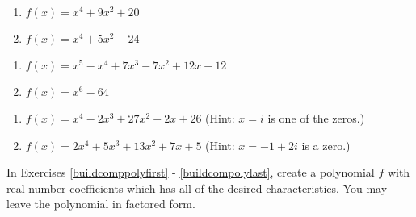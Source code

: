 \begin{multicols}{2}
\begin{enumerate}
\setcounter{enumi}{\value{HW}}

\item $f(x) = x^4+9x^2+20$
\item $f(x) = x^4 + 5x^2 - 24$

\setcounter{HW}{\value{enumi}}
\end{enumerate}
\end{multicols}

\begin{multicols}{2}
\begin{enumerate}
\setcounter{enumi}{\value{HW}}

\item  $f(x) = x^5 - x^4+7x^3-7x^2+12x-12$
\item $f(x) = x^6-64$


\setcounter{HW}{\value{enumi}}
\end{enumerate}
\end{multicols}



\begin{enumerate}
\setcounter{enumi}{\value{HW}}

\item $f(x) = x^{4} - 2x^{3} + 27x^{2} - 2x + 26$ (Hint: $x = i$ is one of the zeros.)
\item  $f(x) = 2x^4+5x^3+13x^2+7x+5$ (Hint:  $x = -1+2i$ is a zero.) \label{compfactpolylast}

\setcounter{HW}{\value{enumi}}
\end{enumerate}

In Exercises \ref{buildcomppolyfirst} - \ref{buildcompolylast}, create a polynomial $f$ with real number coefficients which has all of the desired characteristics.  You may leave the polynomial in factored form. 

